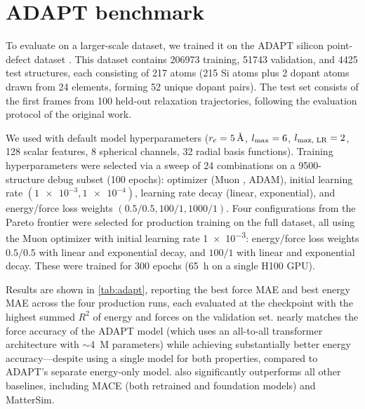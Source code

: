 \documentclass[10pt]{article} %
\newcommand{\CL}[1]{#1}
\begin{document}
\clearpage
\CL{
\section{ADAPT benchmark}
\label{sec:apx-adapt}

To evaluate \lorem on a larger-scale dataset, we trained it on the ADAPT silicon point-defect dataset \citep{dxzhrjk2025pre}. This dataset contains \num{206973} training, \num{51743} validation, and \num{4425} test structures, each consisting of \num{217} atoms (\num{215} Si atoms plus \num{2} dopant atoms drawn from \num{24} elements, forming \num{52} unique dopant pairs). The test set consists of the first frames from \num{100} held-out relaxation trajectories, following the evaluation protocol of the original work.

We used \lorem with default model hyperparameters ($r_{\text{c}}=\qty{5}{\angstrom}$, $l_{\text{max}}=6$, $l_{\text{max, LR}}=2$, \num{128} scalar features, \num{8} spherical channels, \num{32} radial basis functions).
Training hyperparameters were selected via a sweep of \num{24} combinations on a \num{9500}-structure debug subset (\num{100} epochs): optimizer (Muon \cite{jordan2024muon}, ADAM), initial learning rate $(\num{1e-3}, \num{1e-4})$, learning rate decay (linear, exponential), and energy/force loss weights $(0.5/0.5, 100/1, 1000/1)$.
Four configurations from the Pareto frontier were selected for production training on the full dataset, all using the Muon optimizer with initial learning rate \num{1e-3}: energy/force loss weights $0.5/0.5$ with linear and exponential decay, and $100/1$ with linear and exponential decay.
These were trained for \num{300} epochs (\qty{65}{h} on a single H100 GPU).

Results are shown in \cref{tab:adapt}, reporting the best force MAE and best energy MAE across the four production runs, each evaluated at the checkpoint with the highest summed $R^2$ of energy and forces on the validation set.
\lorem nearly matches the force accuracy of the ADAPT model (which uses an all-to-all transformer architecture with $\sim$\qty{4}{M} parameters) while achieving substantially better energy accuracy---despite using a single model for both properties, compared to ADAPT's separate energy-only model. \lorem also significantly outperforms all other baselines, including MACE (both retrained and foundation models) and MatterSim.

}
\end{document}
